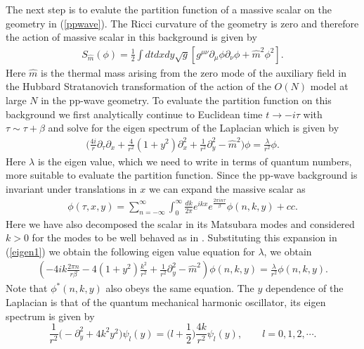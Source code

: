 \documentclass[a4paper,11pt]{article}
\begin{document}
The next step  is to evalute the partition function of a massive scalar on the geometry in (\ref{ppwave}). 
The Ricci curvature of the geometry is zero and therefore the action  of  massive scalar in this background 
is given by 
\begin{eqnarray}
	S_{\hat m } (\phi)  =\frac{1}{2} \int dt dx dy \sqrt{g} 
	\left[ g^{\mu\nu} \partial_\mu \phi \partial_\nu \phi + \hat m^2  \phi^2 \right].
\end{eqnarray}
Here $\hat m$ is the thermal mass arising from the zero mode of the auxiliary field in the Hubbard Stratanovich transformation of the action of the $O(N)$  model at large $N$ in the pp-wave geometry.
To evaluate the partition function on this background we first analytically continue to Euclidean time 
$t\rightarrow -i \tau$  with $\tau \sim \tau + \beta$ 
and solve for the eigen spectrum of the Laplacian which is given by 
\begin{eqnarray} \label{eigen1}
	\Big( \frac{ 4 i }{r} \partial_\tau \partial_x  + \frac{4}{r^2} ( 1+ y^2)\partial_x^2 +  \frac{1}{r^2} \partial_y^2  - \hat m ^2 
	\Big)\phi = \frac\lambda{r^2} \phi.
\end{eqnarray}
Here $\lambda$ is the eigen value, which we need to write in terms of  quantum numbers,  more suitable to evaluate 
the partition function. 
Since the pp-wave background is invariant under translations in  $x$ we can expand the massive scalar as 
\begin{eqnarray}
	\phi( \tau, x, y) = \sum_{n =-\infty}^\infty
	\int_{0}^\infty \frac{d k}{2\pi } e^{i k x } e^{\frac{2\pi i n \tau }{\beta} }  \phi ( n, k , y )  + cc .
\end{eqnarray}
Here we have also decomposed the scalar in its Matsubara modes and considered $k>0 $ for the modes to be well 
behaved as in \cite{Gibbons:1975jb,Komargodski:2026ain}. 
Substituting this expansion in (\ref{eigen1}) we obtain  the following eigen value equation for $\lambda$, we obtain 
\begin{eqnarray}
	(  - 4i  k \frac{2\pi n }{ r \beta}  - 4 ( 1+ y^2 ) \frac{ k^2}{r^2}     +  \frac{1}{r^2} \partial_y^2  - \hat m^2   ) \phi(n, k  , y) = \frac{ \lambda}{r^2}  \phi( n, k,  y) .
\end{eqnarray}
Note that $\phi^*(n, k , y)$ also obeys the same equation. 
The $y$ dependence of the  Laplacian is that of the quantum mechanical harmonic oscillator, its eigen spectrum is given by 
\begin{equation}
	\frac{1}{r^2} \Big( - \partial_y^2 + 4  k^2 y^2 \Big) \psi_l(y) =  \Big( l + \frac{1}{2} \Big) \frac{4k }{r^2}  \psi_l(y), 
	\qquad l = 0, 1, 2, \cdots .
\end{equation}
\end{document}
